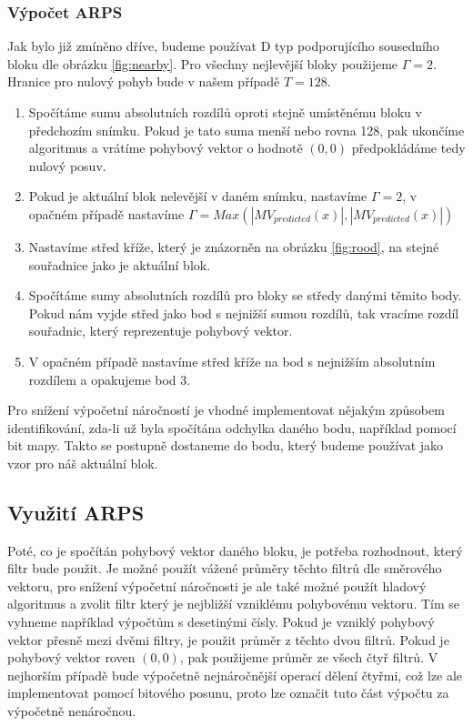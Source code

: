 \documentclass[thesis=M,czech]{FITthesis}[2016/06/26]
\begin{document}
\subsubsection{Výpočet ARPS}
Jak bylo již zmíněno dříve, budeme používat D typ podporujícího sousedního bloku dle obrázku \ref{fig:nearby}. Pro všechny nejlevější bloky použijeme $\Gamma=2$. Hranice pro nulový pohyb bude v našem případě $T=128$.
\begin{enumerate}
\item Spočítáme sumu absolutních rozdílů oproti stejně umístěnému bloku v předchozím snímku. Pokud je tato suma menší nebo rovna 128, pak ukončíme algoritmus a vrátíme pohybový vektor o hodnotě $(0,0)$ předpokládáme tedy nulový posuv.
\item Pokud je aktuální blok nelevější v daném snímku, nastavíme $\Gamma=2$, v opačném případě nastavíme $\Gamma= \mathit{Max}(\left|MV_{predicted}(x)\right|,\left|MV_{predicted}(x)\right|)$
\item Nastavíme střed kříže, který je znázorněn na obrázku \ref{fig:rood}, na stejné souřadnice jako je aktuální blok.
\item Spočítáme sumy absolutních rozdílů pro bloky se středy danými těmito body. Pokud nám vyjde střed jako bod s nejnižší sumou rozdílů, tak vracíme rozdíl souřadnic, který reprezentuje pohybový vektor.
\item V opačném případě nastavíme střed kříže na bod s nejnižším absolutním rozdílem a opakujeme bod 3.
\end{enumerate}
Pro snížení výpočetní náročností je vhodné implementovat nějakým způsobem identifikování, zda-li už byla spočítána odchylka daného bodu, například pomocí bit mapy. 
Takto se postupně dostaneme do bodu, který budeme používat jako vzor pro náš aktuální blok. 

\subsection {Využití ARPS}
Poté, co je spočítán pohybový vektor daného bloku, je potřeba rozhodnout, který filtr bude použit. Je možné použít vážené průměry těchto filtrů dle směrového vektoru, pro snížení výpočetní náročnosti je ale také možné použít hladový algoritmus a zvolit filtr který je nejbližší vzniklému pohybovému vektoru. Tím se vyhneme například výpočtům s desetinými čísly. Pokud je vzniklý pohybový vektor přesně mezi dvěmi filtry, je použit průměr z těchto dvou filtrů. Pokud je pohybový vektor roven $(0,0)$, pak použijeme průměr ze všech čtyř filtrů. V nejhorším případě bude výpočetně nejnáročnější operací dělení čtyřmi, což lze ale implementovat pomocí bitového posunu, proto lze označit tuto část výpočtu za výpočetně nenáročnou.
\end{document}
